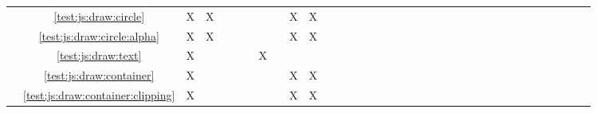 \begin{tabular}{cc|c|c|c|c|c|c|c|c|c|c|c|c|c|c|c|c|c|c|c|c|c|c|c|c|c|c|c|c|c|c|c|c|c|}
\multicolumn{1}{|c|}{} & \ref{test:js:draw:circle} 									& X & X &   &   &   &   &   & X & X &   &   &   &   &   &   &   &   &   &   &   &   &   &   &   &   &   &		 \\ \cline{2-29}
\multicolumn{1}{|c|}{} & \ref{test:js:draw:circle:alpha} 							& X & X &   &   &   &   &   & X & X &   &   &   &   &   &   &   &   &   &   &   &   &   &   &   &   &   &		 \\ \cline{2-29}
\multicolumn{1}{|c|}{} & \ref{test:js:draw:text} 									& X &   &   &   &   & X &   &   &   &   &   &   &   &   &   &   &   &   &   &   &   &   &   &   &   &   &		 \\ \cline{2-29}
\multicolumn{1}{|c|}{} & \ref{test:js:draw:container} 								& X &   &   &   &   &   &   & X & X &   &   &   &   &   &   &   &   &   &   &   &   &   &   &   &   &   &		 \\ \cline{2-29}
\multicolumn{1}{|c|}{} & \ref{test:js:draw:container:clipping} 						& X &   &   &   &   &   &   & X & X &   &   &   &   &   &   &   &   &   &   &   &   &   &   &   &   &   &		 \\ \cline{2-29}
\end{tabular}